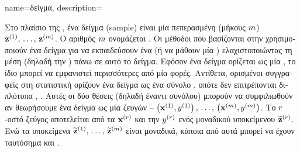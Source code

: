 {name={\foreignlanguage{greek}{δείγμα}},
	description={\foreignlanguage{greek}{Στο πλαίσιο της} , \foreignlanguage{greek}{ένα δείγμα} (sample) 
		\foreignlanguage{greek}{είναι μία πεπερασμένη}  
		(\foreignlanguage{greek}{μήκους} $m$)  
		${\bf z}^{(1)}, \,\ldots, \,{\bf z}^{(m)}$. \foreignlanguage{greek}{Ο αριθμός
 		$m$ ονομάζεται} . \foreignlanguage{greek}{Οι μέθοδοι που βασίζονται στην}		
		 \foreignlanguage{greek}{χρησιμοποιούν ένα δείγμα για να εκπαιδεύσουν ένα}  
		(\foreignlanguage{greek}{ή να μάθουν μία} ) \foreignlanguage{greek}{ελαχιστοποιώντας τη μέση} 
		 (\foreignlanguage{greek}{δηλαδή την} ) \foreignlanguage{greek}{πάνω σε αυτό το 
		δείγμα. Εφόσον ένα δείγμα ορίζεται ως μία} , \foreignlanguage{greek}{το ίδιο}  
		\foreignlanguage{greek}{μπορεί να εμφανιστεί περισσότερες από μία φορές. Αντίθετα, ορισμένοι συγγραφείς στη στατιστική 
		ορίζουν ένα δεί\-γμα ως ένα σύνολο} , \foreignlanguage{greek}{οπότε δεν επιτρέπονται διπλότυπα} 
		\cite{Everitt2010}, \cite{OxfordStatisticsDictionary}.
		\foreignlanguage{greek}{Αυτές οι δύο θέσεις (δηλαδή}  \foreignlanguage{greek}{έναντι συνόλου) μπορούν
		να συμφιλιωθούν αν θεωρήσουμε ένα δείγμα ως μία}  \foreignlanguage{greek}{ζευγών} 
		– 
		$\left( {\bf x}^{(1)},y^{(1)} \right), \,\ldots, \,\left( {\bf x}^{(m)},y^{(m)} \right)$. 
		\foreignlanguage{greek}{Το $r$-οστό ζεύ\-γος αποτελείται από τα}  ${\bf x}^{(r)}$ 
		\foreignlanguage{greek}{και την}  $y^{(r)}$ \foreignlanguage{greek}{ενός μοναδικού 
		υποκείμενου}  $\widetilde{{\bf z}}^{(r)}$. \foreignlanguage{greek}{Ενώ τα υποκείμενα}  
 		 $\widetilde{{\bf z}}^{(1)},\,\ldots,\,\widetilde{{\bf z}}^{(m)}$ \foreignlanguage{greek}{είναι 
		μοναδικά, κάποια από αυτά μπορεί να έχουν ταυτόσημα}  \foreignlanguage{greek}{και} .  
 		\begin{figure}[H]
 		\begin{center}
 			\begin{tikzpicture}[>=Latex, font=\small]

\end{tikzpicture}
\end{center}
\end{figure}}}
